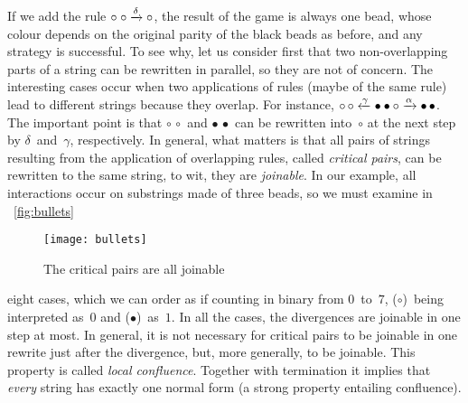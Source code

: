 If we add the rule \(\circ\; \circ \xrightarrow{\smash{\delta}}
\circ\), the result of the game is always one bead, whose colour
depends on the original parity of the black beads as before, and any
strategy is successful. To see why, let us consider first that two
non\hyp{}overlapping parts of a string can be rewritten in parallel,
so they are not of concern. The interesting cases occur when two
applications of rules (maybe of the same rule) lead to different
strings because they overlap. For instance, \(\circ \, \circ
\xleftarrow{\smash{\gamma}} \bullet \bullet \circ
\xrightarrow{\smash{\alpha}} \bullet \, \bullet\). The important point
is that \(\circ \, \circ\) and \(\bullet \, \bullet\) can be rewritten
into~\(\circ\) at the next step by \(\delta\)~and~\(\gamma\),
respectively. In general, what matters is that all pairs of strings
resulting from the application of overlapping rules, called
\emph{critical pairs}, can be
rewritten to the same string, to wit, they are \emph{joinable}. In our
example, all interactions occur on substrings made of three beads, so
we must examine in \fig~\vref{fig:bullets}
\begin{figure}[b]
\centering
\texttt{[image: bullets]}
\caption{The critical pairs are all joinable\label{fig:bullets}}
\end{figure}
eight cases, which we can order as if counting in binary from
\(0\)~to~\(7\), (\(\circ\))~being interpreted as~\(0\) and
(\(\bullet\))~as~\(1\). In all the cases, the divergences are joinable
in one step at most. In general, it is not necessary for critical
pairs to be joinable in one rewrite just after the divergence, but,
more generally, to be joinable. This property is called \emph{local
  confluence}. Together
with termination it implies that \emph{every} string has exactly one
normal form (a strong property entailing confluence).

